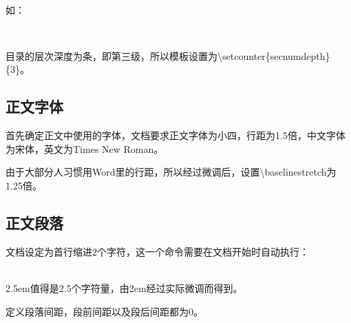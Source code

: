 {\\}

如：

{\centering {\verb|\titleformat{\chapter}{\filcenter \heiti \bfseries \sanhao}{\thechapter}{1em}{}|}\\}

目录的层次深度为条，即第三级，所以模板设置为\textbackslash setcounter\{secnumdepth\}\{3\}。
\subsection{正文字体}
\label{sec:normalsize}
首先确定正文中使用的字体，文档要求正文字体为小四，行距为1.5倍，中文字体为宋体，英文为Times New Roman。

由于大部分人习惯用Word里的行距，所以经过微调后，设置\textbackslash baselinestretch为1.25倍。

\subsection{正文段落}
文档设定为首行缩进2个字符，这一个命令需要在文档开始时自动执行：

{\centering {\verb|\setlength{\parindent}{2.5em}|}\\}
2.5em值得是2.5个字符量，由2em经过实际微调而得到。

定义段落间距，段前间距以及段后间距都为0。

{\centering {\verb|\setlength{\parskip}{0bp \@plus .5bp \@minus .5bp}|}\\}

